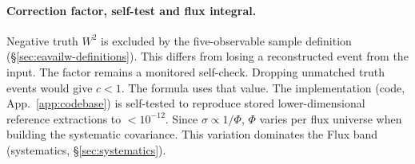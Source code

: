 \paragraph{Correction factor, self-test and flux integral.} Negative truth $W^{2}$ is excluded by the five-observable sample definition (\S\ref{sec:eavailw-definitions}). This differs from losing a reconstructed event from the input. The factor remains a monitored self-check. Dropping unmatched truth events would give $c<1$. The formula uses that value. The implementation (code, App.~\ref{app:codebase}) is self-tested to reproduce stored lower-dimensional reference extractions to $<10^{-12}$. Since $\sigma\propto1/\Phi$, $\Phi$ varies per flux universe when building the systematic covariance. This variation dominates the Flux band (systematics, \S\ref{sec:systematics}).

